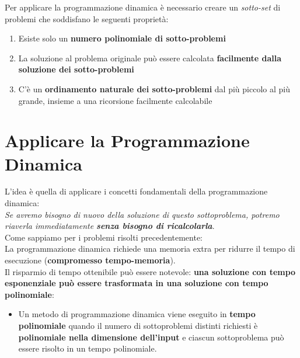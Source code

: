 Per applicare la programmazione dinamica è necessario creare un
\emph{sotto-set} di problemi che soddisfano le seguenti proprietà:
\begin{enumerate}
  \item Esiste solo un \textbf{numero polinomiale di sotto-problemi}
  \item La soluzione al problema originale può essere calcolata \textbf{facilmente dalla soluzione dei sotto-problemi}
  \item C'è un \textbf{ordinamento naturale dei sotto-problemi} dal più piccolo al più grande, insieme a una ricorsione facilmente calcolabile
\end{enumerate}

\section{Applicare la Programmazione Dinamica}

L'idea è quella di applicare i concetti fondamentali della
programmazione dinamica:\\

\emph{Se avremo bisogno di nuovo della
  soluzione di questo sottoproblema, potremo riaverla immediatamente
  \textbf{senza bisogno di ricalcolarla}}. \\
  
Come sappiamo per i problemi risolti precedentemente: \\

La programmazione dinamica richiede una memoria
extra per ridurre il tempo di esecuzione (\textbf{compromesso
  tempo-memoria}).\\

Il risparmio di tempo ottenibile può essere notevole: \textbf{una
  soluzione con tempo esponenziale può essere trasformata in una soluzione
  con tempo polinomiale}:
\begin{itemize}
  \item Un metodo di programmazione dinamica viene
        eseguito in \textbf{tempo polinomiale} quando il numero di sottoproblemi
        distinti richiesti è \textbf{polinomiale nella dimensione dell'input} e
        ciascun sottoproblema può essere risolto in un tempo polinomiale.
\end{itemize}

